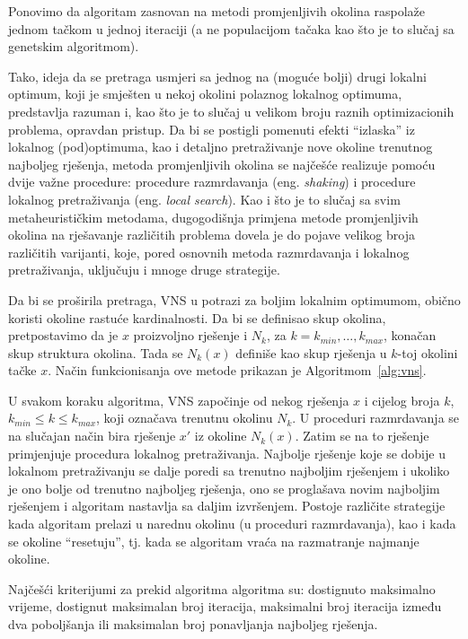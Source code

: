 \documentclass[a4paper, utf8, 11pt, colorlinks]{book}
\begin{document}
Ponovimo da algoritam zasnovan na metodi promjenljivih okolina raspolaže jednom tačkom u jednoj iteraciji (a ne populacijom tačaka kao što je to slučaj sa genetskim algoritmom).

Tako, ideja da se pretraga usmjeri sa jednog na (moguće bolji) drugi lokalni optimum, koji je smješten u nekoj okolini polaznog lokalnog optimuma, predstavlja razuman  i, kao što je to slučaj u velikom broju raznih optimizacionih problema, opravdan pristup.
Da bi se postigli pomenuti efekti ``izlaska'' iz lokalnog (pod)optimuma, kao i detaljno pretraživanje nove okoline trenutnog najboljeg rješenja, metoda promjenljivih okolina se najčešće realizuje pomoću dvije važne procedure: procedure razmrdavanja (eng. \emph{shaking}) i procedure lokalnog pretraživanja (eng. \emph{local search}). Kao i što je to slučaj sa svim metaheurističkim metodama, dugogodišnja primjena metode promjenljivih okolina na rješavanje različitih problema dovela je do pojave velikog broja različitih varijanti, koje, pored osnovnih metoda razmrdavanja i lokalnog pretraživanja, uključuju i mnoge druge strategije.

Da bi se proširila pretraga,  VNS u potrazi za boljim lokalnim optimumom, obično koristi okoline rastuće kardinalnosti. Da bi se definisao skup okolina, pretpostavimo da je $x$ proizvoljno rješenje i $N_k$, za $k=k_{min},\ldots,k_{max}$, konačan skup struktura okolina. Tada se  $N_k(x)$ definiše kao skup rješenja u $k$-toj okolini tačke $x$. 
Način funkcionisanja ove metode prikazan je Algoritmom~\ref{alg:vns}. 


U svakom koraku algoritma, VNS započinje od nekog rješenja $x$ i cijelog broja $k$, $k_{min}\leqslant k\leqslant k_{max}$, koji označava trenutnu okolinu $N_k$. U proceduri razmrdavanja
se na slučajan način bira rješenje  $x'$ iz okoline  $N_k(x)$. Zatim se na to rješenje primjenjuje procedura lokalnog pretraživanja. Najbolje rješenje koje se dobije u lokalnom pretraživanju se dalje poredi sa trenutno najboljim rješenjem i ukoliko je ono bolje od trenutno najboljeg rješenja, ono se proglašava novim najboljim rješenjem i algoritam nastavlja sa daljim izvršenjem. Postoje različite strategije kada algoritam prelazi u narednu okolinu (u proceduri razmrdavanja), kao i kada se okoline ``resetuju'', tj. kada se algoritam vraća na razmatranje najmanje okoline. 

Najčešći kriterijumi za prekid algoritma algoritma su: dostignuto maksimalno  vrijeme, dostignut maksimalan broj iteracija, maksimalni broj iteracija između dva poboljšanja ili maksimalan broj ponavljanja najboljeg rješenja.
\end{document}
